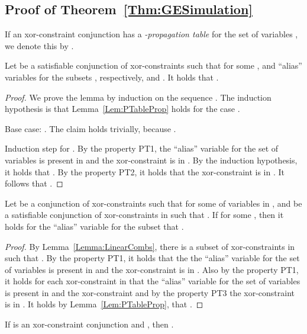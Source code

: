 \subsection{Proof of Theorem~\ref{Thm:GESimulation}}

If an xor-constraint conjunction  has a {\it \UP{}-propagation table} for
the set of variables , we denote this by
. 



\begin{lemma}
\label{Lem:PTableProp}
Let  be a satisfiable conjunction of xor-constraints such that  for some , and  ``alias'' variables for the subsets , respectively, and .
It holds that .
\end{lemma}


\begin{proof}
We prove the lemma by induction on the sequence .
The induction hypothesis is that Lemma~\ref{Lem:PTableProp} holds for the
case .

Base case: .
The claim holds trivially, because .

Induction step for . 
By the property PT1, the ``alias'' variable  for the set of variables  is present in  and the xor-constraint  is in .
By the induction hypothesis, it holds that .
By the property PT2, it holds that the xor-constraint  is in .
It follows that .

\end{proof}

\begin{lemma}
\label{Lem:PTableProp2}
Let  be a conjunction of xor-constraints such that  for some 
of variables in , and  be a satisfiable conjunction of
xor-constraints in  such that .
If  for some , then
it holds for the ``alias'' variable  for the subset  that .
\end{lemma}

\begin{proof}
By Lemma~\ref{Lemma:LinearCombs}, there is a subset  of xor-constraints in  such that .
By the property PT1, it holds that the the ``alias'' variable  for the set of variables  is present in  and the xor-constraint  is in .
Also by the property PT1, it holds for each xor-constraint  in  that the ``alias'' variable  for the set of
variables  is present in  and the xor-constraint
 and by the property PT3 the xor-constraint  is in .
It holds by Lemma~\ref{Lem:PTableProp}, that .
\end{proof}


\begin{lemma}
\label{Lem:PropTableImpl}
If  is an xor-constraint conjunction and , then  .
\end{lemma}

